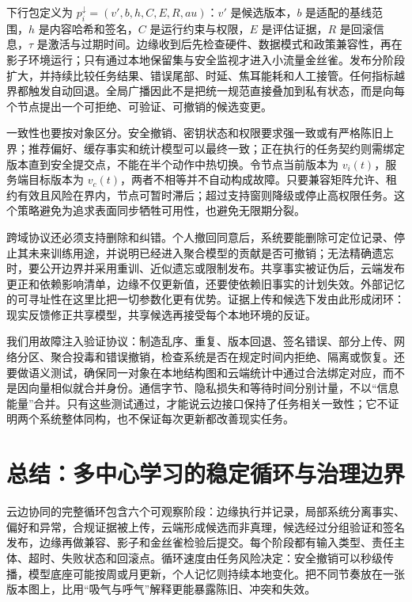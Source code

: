 下行包定义为 $p_i^{\downarrow}=(v',b,h,C,E,R,	au)$：$v'$ 是候选版本，$b$ 是适配的基线范围，$h$ 是内容哈希和签名，$C$ 是运行约束与权限，$E$ 是评估证据，$R$ 是回滚信息，$\tau$ 是激活与过期时间。边缘收到后先检查硬件、数据模式和政策兼容性，再在影子环境运行；只有通过本地保留集与安全监视才进入小流量金丝雀。发布分阶段扩大，并持续比较任务结果、错误尾部、时延、焦耳能耗和人工接管。任何指标越界都触发自动回退。全局广播因此不是把统一规范直接叠加到私有状态，而是向每个节点提出一个可拒绝、可验证、可撤销的候选变更。

一致性也要按对象区分。安全撤销、密钥状态和权限要求强一致或有严格陈旧上界；推荐偏好、缓存事实和统计模型可以最终一致；正在执行的任务契约则需绑定版本直到安全提交点，不能在半个动作中热切换。令节点当前版本为 $v_i(t)$，服务端目标版本为 $v_c(t)$，两者不相等并不自动构成故障。只要兼容矩阵允许、租约有效且风险在界内，节点可暂时滞后；超过支持窗则降级或停止高权限任务。这个策略避免为追求表面同步牺牲可用性，也避免无限期分裂。

跨域协议还必须支持删除和纠错。个人撤回同意后，系统要能删除可定位记录、停止其未来训练用途，并说明已经进入聚合模型的贡献是否可撤销；无法精确遗忘时，要公开边界并采用重训、近似遗忘或限制发布。共享事实被证伪后，云端发布更正和依赖影响清单，边缘不仅更新值，还要使依赖旧事实的计划失效。外部记忆的可寻址性在这里比把一切参数化更有优势。证据上传和候选下发由此形成闭环：现实反馈修正共享模型，共享候选再接受每个本地环境的反证。

我们用故障注入验证协议：制造乱序、重复、版本回退、签名错误、部分上传、网络分区、聚合投毒和错误撤销，检查系统是否在规定时间内拒绝、隔离或恢复。还要做语义测试，确保同一对象在本地结构图和云端统计中通过合法绑定对应，而不是因向量相似就合并身份。通信字节、隐私损失和等待时间分别计量，不以“信息能量”合并。只有这些测试通过，才能说云边接口保持了任务相关一致性；它不证明两个系统整体同构，也不保证每次更新都改善现实任务。

\section{总结：多中心学习的稳定循环与治理边界}
\label{sec:summary_distributed}

云边协同的完整循环包含六个可观察阶段：边缘执行并记录，局部系统分离事实、偏好和异常，合规证据被上传，云端形成候选而非真理，候选经过分组验证和签名发布，边缘再做兼容、影子和金丝雀检验后提交。每个阶段都有输入类型、责任主体、超时、失败状态和回滚点。循环速度由任务风险决定：安全撤销可以秒级传播，模型底座可能按周或月更新，个人记忆则持续本地变化。把不同节奏放在一张版本图上，比用“吸气与呼气”解释更能暴露陈旧、冲突和失效。

